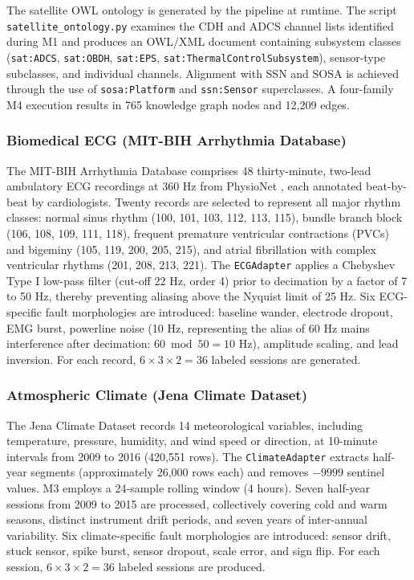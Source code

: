 \documentclass[conference]{IEEEtran}
\begin{document}
The satellite OWL ontology is generated by the pipeline at runtime. The script \texttt{satellite\_ontology.py} examines the CDH and ADCS channel lists identified during M1 and produces an OWL/XML document containing subsystem classes (\texttt{sat:ADCS}, \texttt{sat:OBDH}, \texttt{sat:EPS}, \texttt{sat:ThermalControlSubsystem}), sensor-type subclasses, and individual channels. Alignment with SSN and SOSA is achieved through the use of \texttt{sosa:Platform} and \texttt{ssn:Sensor} superclasses. A four-family M4 execution results in 765 knowledge graph nodes and 12,209 edges.

\subsubsection{Biomedical ECG (MIT-BIH Arrhythmia Database)}

The MIT-BIH Arrhythmia Database \cite{moody2001mitbih} comprises 48 thirty-minute, two-lead ambulatory ECG recordings at 360 Hz from PhysioNet \cite{goldberger2000physiobank}, each annotated beat-by-beat by cardiologists. Twenty records are selected to represent all major rhythm classes: normal sinus rhythm (100, 101, 103, 112, 113, 115), bundle branch block (106, 108, 109, 111, 118), frequent premature ventricular contractions (PVCs) and bigeminy (105, 119, 200, 205, 215), and atrial fibrillation with complex ventricular rhythms (201, 208, 213, 221). The \texttt{ECGAdapter} applies a Chebyshev Type I low-pass filter (cut-off 22 Hz, order 4) prior to decimation by a factor of 7 to 50 Hz, thereby preventing aliasing above the Nyquist limit of 25 Hz. Six ECG-specific fault morphologies are introduced: baseline wander, electrode dropout, EMG burst, powerline noise (10 Hz, representing the alias of 60 Hz mains interference after decimation: $60 \bmod 50 = 10$ Hz), amplitude scaling, and lead inversion. For each record, $6 \times 3 \times 2 = 36$ labeled sessions are generated.

\subsubsection{Atmospheric Climate (Jena Climate Dataset)}

The Jena Climate Dataset \cite{jena_climate} records 14 meteorological variables, including temperature, pressure, humidity, and wind speed or direction, at 10-minute intervals from 2009 to 2016 (420,551 rows). The \texttt{ClimateAdapter} extracts half-year segments (approximately 26,000 rows each) and removes $-9999$ sentinel values. M3 employs a 24-sample rolling window (4 hours). Seven half-year sessions from 2009 to 2015 are processed, collectively covering cold and warm seasons, distinct instrument drift periods, and seven years of inter-annual variability. Six climate-specific fault morphologies are introduced: sensor drift, stuck sensor, spike burst, sensor dropout, scale error, and sign flip. For each session, $6 \times 3 \times 2 = 36$ labeled sessions are produced.
\end{document}
